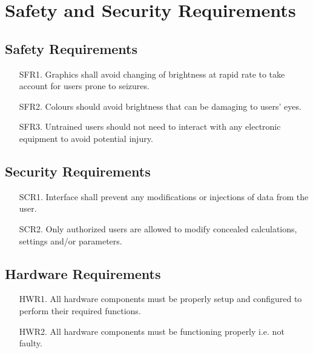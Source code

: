 \documentclass{article}
\begin{document}
\section{Safety and Security Requirements}

\subsection*{Safety Requirements}
\begin{enumerate}
  \item[SFR1.] Graphics shall avoid changing of brightness at rapid rate to take account for users prone to seizures.
  \item[SFR2.] Colours should avoid brightness that can be damaging to users' eyes.
  \item[SFR3.] Untrained users should not need to interact with any electronic equipment to avoid potential injury.\\
\end{enumerate}

\subsection*{Security Requirements}
\begin{enumerate}
  \item[SCR1.] Interface shall prevent any modifications or injections of data from the user. 
  \item[SCR2.] Only authorized users are allowed to modify concealed calculations, settings and/or parameters. \\
\end{enumerate}

\subsection*{Hardware Requirements}
\begin{enumerate}
  \item[HWR1.] All hardware components must be properly setup and configured to perform their required functions. 
  \item[HWR2.] All hardware components must be functioning properly i.e. not faulty. \\
\end{enumerate} 
\end{document}
